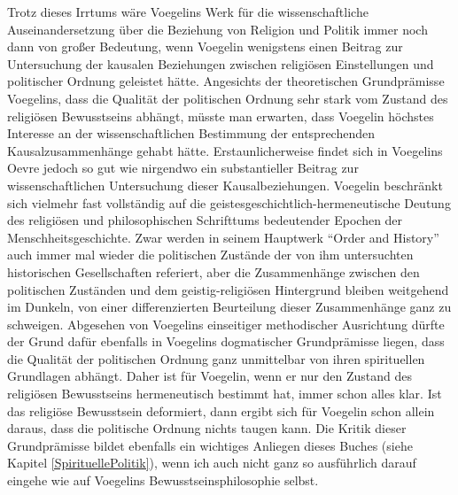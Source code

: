 Trotz dieses Irrtums wäre Voegelins Werk für die wissenschaftliche
Auseinandersetzung über die Beziehung von Religion und Politik immer noch dann
von großer Bedeutung, wenn Voegelin wenigstens einen Beitrag zur Untersuchung
der kausalen Beziehungen zwischen religiösen Einstellungen und politischer
Ordnung geleistet hätte. Angesichts der theoretischen Grundprämisse Voegelins,
dass die Qualität der politischen Ordnung sehr stark vom Zustand des
religiösen Bewusstseins abhängt, müsste man erwarten, dass Voegelin höchstes
Interesse an der wissenschaftlichen Bestimmung der entsprechenden
Kausalzusammenhänge gehabt hätte. Erstaunlicherweise findet sich in Voegelins
Oevre jedoch so gut wie nirgendwo ein substantieller Beitrag zur
wissenschaftlichen Untersuchung dieser Kausalbeziehungen. Voegelin beschränkt
sich vielmehr fast vollständig auf die geistesgeschichtlich-hermeneutische
Deutung des religiösen und philosophischen Schrifttums bedeutender Epochen der
Menschheitsgeschichte.  Zwar werden in seinem Hauptwerk ``Order and History''
auch immer mal wieder die politischen Zustände der von ihm untersuchten
historischen Gesellschaften referiert, aber die Zusammenhänge zwischen den
politischen Zuständen und dem geistig-religiösen Hintergrund bleiben
weitgehend im Dunkeln, von einer differenzierten Beurteilung dieser
Zusammenhänge ganz zu schweigen.  Abgesehen von Voegelins einseitiger
methodischer Ausrichtung dürfte der Grund dafür ebenfalls in Voegelins
dogmatischer Grundprämisse liegen, dass die Qualität der politischen Ordnung
ganz unmittelbar von ihren spirituellen Grundlagen abhängt. Daher ist für
Voegelin, wenn er nur den Zustand des religiösen Bewusstseins hermeneutisch
bestimmt hat, immer schon alles klar.  Ist das religiöse Bewusstsein
deformiert, dann ergibt sich für Voegelin schon allein daraus, dass die
politische Ordnung nichts taugen kann.  Die Kritik dieser Grundprämisse bildet
ebenfalls ein wichtiges Anliegen dieses Buches (siehe Kapitel
\ref{SpirituellePolitik}), wenn ich auch nicht ganz so ausführlich darauf
eingehe wie auf Voegelins Bewusstseinsphilosophie selbst.

